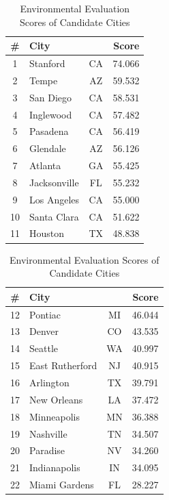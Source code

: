 \documentclass{mcmthesis}
\begin{document}
\begin{table}
\centering
\caption{Environmental Evaluation Scores of Candidate Cities} 
\label{tab:final_scores}

\begin{minipage}[t]{0.44\textwidth}
\centering
\begin{tabular}{cl>{\ttfamily}cr}
\toprule
\textbf{\#} & \textbf{City} & \multicolumn{1}{c}{\textbf{State}} & \textbf{Score} \\
\midrule
1 & Stanford & CA & 74.066 \\
2 & Tempe & AZ & 59.532 \\
3 & San Diego & CA & 58.531 \\
4 & Inglewood & CA & 57.482 \\
5 & Pasadena & CA & 56.419 \\
6 & Glendale & AZ & 56.126 \\
7 & Atlanta  & GA & 55.425 \\
8 & Jacksonville & FL & 55.232  \\
9 & Los Angeles & CA & 55.000 \\
10 & Santa Clara & CA & 51.622 \\
11 & Houston & TX & 48.838 \\
\bottomrule
\end{tabular}
\end{minipage}
\hspace{0.04\textwidth}
\begin{minipage}[t]{0.44\textwidth}
\centering
\begin{tabular}{cl>{\ttfamily}cr}
\toprule
\textbf{\#} & \textbf{City} & \multicolumn{1}{c}{\textbf{State}} & \textbf{Score} \\
\midrule
12 & Pontiac & MI & 46.044 \\
13 & Denver & CO & 43.535 \\
14 & Seattle & WA & 40.997 \\
15 & East Rutherford & NJ & 40.915 \\
16 & Arlington & TX & 39.791 \\
17 & New Orleans & LA & 37.472 \\
18 & Minneapolis & MN & 36.388 \\
19 & Nashville & TN & 34.507 \\
20 & Paradise & NV & 34.260 \\
21 & Indianapolis & IN & 34.095 \\
22 & Miami Gardens & FL & 28.227 \\
\bottomrule
\end{tabular}
\end{minipage}
\end{table}
\end{document}
